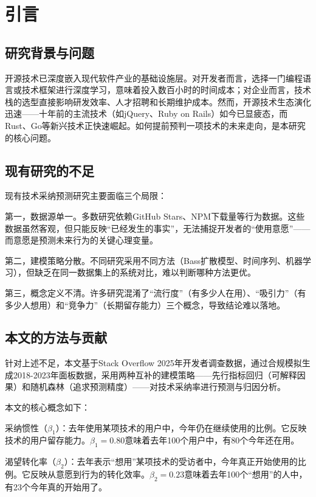 \documentclass[fontset=windows]{cjc}
\begin{document}
\maketitle

\section{引言}
\subsection{研究背景与问题}
开源技术已深度嵌入现代软件产业的基础设施层。对开发者而言，选择一门编程语言或技术框架进行深度学习，意味着投入数百小时的时间成本；对企业而言，技术栈的选型直接影响研发效率、人才招聘和长期维护成本。然而，开源技术生态演化迅速——十年前的主流技术（如jQuery、Ruby on Rails）如今已显疲态，而Rust、Go等新兴技术正快速崛起。如何提前预判一项技术的未来走向，是本研究的核心问题。

\subsection{现有研究的不足}
现有技术采纳预测研究主要面临三个局限：

第一，数据源单一。多数研究依赖GitHub Stars、NPM下载量等行为数据。这些数据虽然客观，但只能反映“已经发生的事实”，无法捕捉开发者的“使用意愿”——而意愿是预测未来行为的关键心理变量。

第二，建模策略分散。不同研究采用不同方法（Bass扩散模型、时间序列、机器学习），但缺乏在同一数据集上的系统对比，难以判断哪种方法更优。

第三，概念定义不清。许多研究混淆了“流行度”（有多少人在用）、“吸引力”（有多少人想用）和“竞争力”（长期留存能力）三个概念，导致结论难以落地。

\subsection{本文的方法与贡献}
针对上述不足，本文基于Stack Overflow 2025年开发者调查数据，通过合规模拟生成2018-2023年面板数据，采用两种互补的建模策略——先行指标回归（可解释因果）和随机森林（追求预测精度）——对技术采纳率进行预测与归因分析。

本文的核心概念如下：

采纳惯性（$\beta_1$）：去年使用某项技术的用户中，今年仍在继续使用的比例。它反映技术的用户留存能力。$\beta_1=0.80$意味着去年100个用户中，有80个今年还在用。

渴望转化率（$\beta_2$）：去年表示“想用”某项技术的受访者中，今年真正开始使用的比例。它反映从意愿到行为的转化效率。$\beta_2=0.23$意味着去年100个“想用”的人中，有23个今年真的开始用了。
\end{document}

